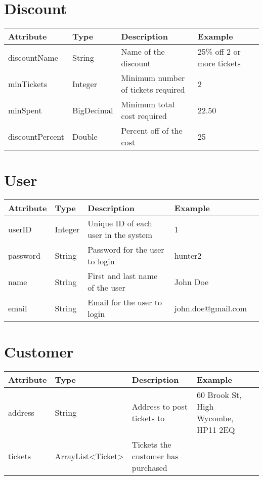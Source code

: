 \section{Discount}
\keepXColumns
\begin{tabularx}{\linewidth}{l l l X l}
  \textbf{Attribute}&\textbf{Type}&\textbf{Description}&\textbf{Example}\\
  \endhead
  discountName    & String      & Name of the discount                & 25\% off 2 or more tickets\\
  minTickets      & Integer     & Minimum number of tickets required  & 2\\
  minSpent        & BigDecimal  & Minimum total cost required         & 22.50\\
  discountPercent & Double      & Percent off of the cost             & 25
\end{tabularx}

\section{User}
\keepXColumns
\begin{tabularx}{\linewidth}{l l l X l}
  \textbf{Attribute}&\textbf{Type}&\textbf{Description}&\textbf{Example}\\
  \endhead
  userID    & Integer & Unique ID of each user in the system  & 1\\
  password  & String  & Password for the user to login        & hunter2\\
  name      & String  & First and last name of the user       & John Doe\\
  email     & String  & Email for the user to login           & john.doe@gmail.com
\end{tabularx}

\section{Customer}
\keepXColumns
\begin{tabularx}{\linewidth}{l l l X l}
  \textbf{Attribute}&\textbf{Type}&\textbf{Description}&\textbf{Example}\\
  \endhead
  address & String            & Address to post tickets to          &  60 Brook St, High Wycombe, HP11 2EQ \\
  tickets & ArrayList<Ticket> & Tickets the customer has purchased  &
\end{tabularx}

